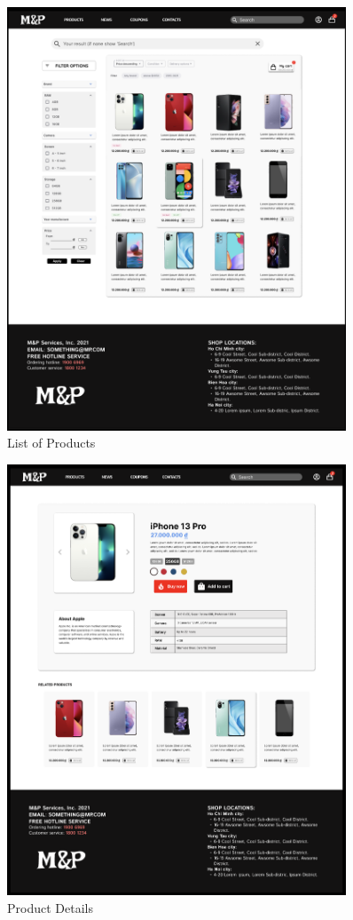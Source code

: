 \documentclass[a4paper]{article}
\numberwithin{equation}{section}
\begin{document}
\begin{figure}
  \centering
  \includegraphics[width=0.9\textwidth]{assets/p2/p2.png}
  \caption{List of Products}
\end{figure}

\begin{figure}
  \centering
  \includegraphics[width=0.9\textwidth]{assets/p2/p3.png}
  \caption{Product Details}
\end{figure}
\end{document}
